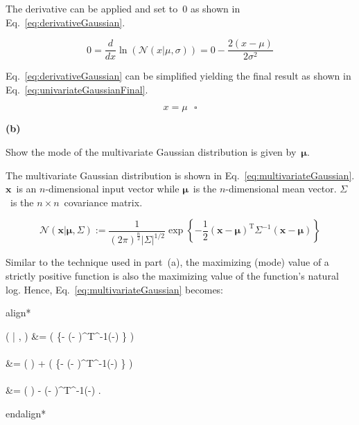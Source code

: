 \documentclass{report}
\newcommand{\hangindentdistance}{1cm}
\newenvironment{aligncustom}
{ \csname align*\endcsname %
    \centering
}
{
  \csname endalign*\endcsname
}
\newenvironment{subproblem}[1]
{%
  \par%
  \medskip
  \leftskip=0pt\rightskip=0pt%
  \bfseries  
  (#1) \hangindent=\hangindentdistance \hangafter=1 \tabto{\hangindentdistance}
}
{
  \par\medskip
}
\begin{document}
  The derivative can be applied and set to~$0$ as shown in Eq.~\eqref{eq:derivativeGaussian}.
  
  \begin{equation}
    0 = \frac{d}{dx} \ln \left( \mathcal{N}(x|\mu,\sigma) \right) = 0 - \frac{2(x-\mu)}{2\sigma^2}
    \label{eq:derivativeGaussian} 
  \end{equation}
  
  Eq.~\eqref{eq:derivativeGaussian} can be simplified yielding the final result as shown in Eq.~\eqref{eq:univariateGaussianFinal}.
  
  \begin{equation}
    x = \mu ~~~\square
    \label{eq:univariateGaussianFinal}
  \end{equation}
  

  
  \begin{subproblem}{b}
    Show the mode of the multivariate Gaussian distribution is given by~$\bm{\mu}$.
  \end{subproblem}
  
  The multivariate Gaussian distribution is shown in Eq.~\eqref{eq:multivariateGaussian}.  $\mathbf{x}$~is an $n$-dimensional input vector while $\bm{\mu}$~is the $n$-dimensional mean vector.  $\Sigma$~is the $n \times n$~covariance matrix.
    
  \begin{equation}
    \mathcal{N}(\mathbf{x} | \bm{\mu}, \Sigma) := \frac{1}{(2\pi)^{\frac{n}{2}} | \Sigma | ^ {1/2} } \exp\left\{-\frac{1}{2} \left(\mathbf{x}-\bm{\mu} \right)^{\textrm{T}}\Sigma^{-1}\left(\mathbf{x}-\bm{\mu}\right) \right\}
    \label{eq:multivariateGaussian}
  \end{equation}

  Similar to the technique used in part~(a), the maximizing (mode) value of a strictly positive function is also the maximizing value of the function's natural log.  Hence, Eq.~\eqref{eq:multivariateGaussian} becomes:
  
  \begin{aligncustom}
    \ln {}( | \bm{\mu}, \Sigma)  &= \ln \left(  \exp\left\{- \left(-\bm{\mu} \right)^{\textrm{T}}\Sigma^{-1}\left(-\bm{\mu}\right) \right\} \right) \\~\\
    &= \ln \left(  \right) + \ln \left( \exp\left\{- \left(-\bm{\mu} \right)^{\textrm{T}}\Sigma^{-1}\left(-\bm{\mu}\right) \right\} \right) \\~\\
    &= \ln \left(  \right) -  \left(-\bm{\mu} \right)^{\textrm{T}}\Sigma^{-1}\left(-\bm{\mu}\right)  \textrm{.}
  \end{aligncustom}
\end{document}
